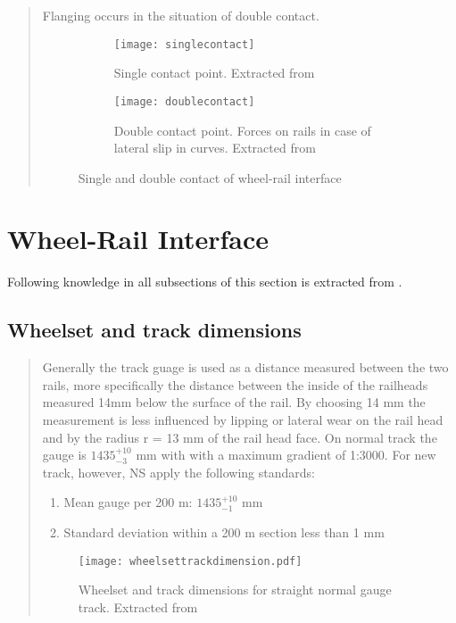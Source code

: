 \begin{appendices}
\begin{quote}
Flanging occurs in the situation of double contact. 

\begin{figure}[h!]
\centering
    \begin{subfigure}[b]{0.2\textwidth}
        \centering
        \texttt{[image: singlecontact]}
        \caption{Single contact point.  Extracted from \citet[Figure 2.13]{esveld2001modern}}
        \label{fig:singlecontact}
    \end{subfigure}
    \begin{subfigure}[b]{0.5\textwidth}
        \texttt{[image: doublecontact]}
        \caption{Double contact point. Forces on rails in case of lateral slip in curves. Extracted from \citet[Figure 2.14]{esveld2001modern}}
        \label{fig:doublecontract}
    \end{subfigure}
    \caption{Single and double contact of wheel-rail interface}
\end{figure}
\end{quote}
\section{Wheel-Rail Interface}
Following knowledge in all subsections of this section is extracted from \citet{esveld2001modern}. 
\subsection{Wheelset and track dimensions}
\begin{quote}
Generally the track guage is used as a distance measured between the two rails, more specifically the distance between the inside of the railheads measured 14mm below the surface of the rail. By choosing 14 mm the measurement is less influenced by lipping or lateral wear on the rail head and by the radius r = 13 mm of the rail head face. On normal track the gauge is $1435^{+10}_{-3}$ mm with with a maximum gradient of 1:3000. For new track, however, NS apply the following standards:

\begin{enumerate}
\item Mean gauge per 200 m: $1435^{+10}_{-1}$ mm
\item Standard deviation within a 200 m section less than 1 mm
\end{enumerate}

\begin{figure}[h]
\centering
\texttt{[image: wheelsettrackdimension.pdf]}
\caption{Wheelset and track dimensions for straight normal gauge track. Extracted from \citet[p.17]{esveld2001modern}}
\label{fig:wheelset and track dimensions}
\end{figure}


\end{quote}
\end{appendices}

